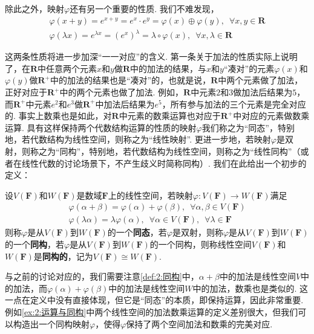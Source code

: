 除此之外，映射$\varphi$还有另一个重要的性质. 我们不难发现，
\begin{gather*}
    \varphi(x+y)=e^{x+y}=e^x\cdot e^y=\varphi(x)\oplus\varphi(y),\enspace\forall x,y\in\mathbf{R} \\
    \varphi(\lambda x)=e^{\lambda x}=(e^x)^\lambda=\lambda\circ\varphi(x),\enspace\forall x,\lambda\in\mathbf{R}
\end{gather*}

这两条性质将进一步加深``一一对应''的含义. 第一条关于加法的性质实际上说明了，在$\mathbf{R}$中任意两个元素$x$和$y$做$\mathbf{R}$中的加法的结果，与$x$和$y$``凑对''的元素$\varphi(x)$和$\varphi(y)$做$\mathbf{R}^+$中的加法的结果也是``凑对''的，也就是说，$\mathbf{R}$中两个元素做了加法，正好对应于$\mathbf{R}^+$中的两个元素也做了加法. 例如，$\mathbf{R}$中元素$2$和$3$做加法后结果为$5$，而$\mathbf{R}^+$中元素$e^2$和$e^3$做$\mathbf{R}^+$中加法后结果为$e^5$，所有参与加法的三个元素是完全对应的. 事实上数乘也是如此，对$\mathbf{R}$中元素的数乘运算也对应于$\mathbf{R}^+$中对应的元素做数乘运算. 具有这样保持两个代数结构运算的性质的映射$\varphi$我们称之为``同态''，特别地，若代数结构为线性空间，则称之为``线性映射''. 更进一步地，若映射$\varphi$是双射，则称之为``同构''，特别地，若代数结构为线性空间，则称之为``线性同构''（或者在线性代数的讨论场景下，不产生歧义时简称同构）. 我们在此给出一个初步的定义：
\begin{definition} \label{def:2:同构}
    设$V(\mathbf{F})$和$W(\mathbf{F})$是数域$\mathbf{F}$上的线性空间，若映射$\varphi:V(\mathbf{F})\to W(\mathbf{F})$满足
    \begin{gather*}
        \varphi(\alpha+\beta)=\varphi(\alpha)+\varphi(\beta),\enspace\forall\alpha,\beta\in V(\mathbf{F}) \\
        \varphi(\lambda\alpha)=\lambda\varphi(\alpha),\enspace\forall\alpha\in V(\mathbf{F}),\enspace\forall\lambda\in\mathbf{F}
    \end{gather*}
    则称$\varphi$是从$V(\mathbf{F})$到$W(\mathbf{F})$的一个\textbf{同态}，若$\varphi$是双射，则称$\varphi$是从$V(\mathbf{F})$到$W(\mathbf{F})$的一个\textbf{同构}，若$\varphi$是从$V(\mathbf{F})$到$W(\mathbf{F})$的一个同构，则称线性空间$V(\mathbf{F})$和$W(\mathbf{F})$是\textbf{同构的}，记为$V(\mathbf{F})\cong W(\mathbf{F})$.
\end{definition}

与之前的讨论对应的，我们需要注意\autoref{def:2:同构}中，$\alpha+\beta$中的加法是线性空间$V$中的加法，而$\varphi(\alpha)+\varphi(\beta)$中的加法是线性空间$W$中的加法，数乘也是类似的. 这一点在定义中没有直接体现，但它是``同态''的本质，即保持运算，因此非常重要. 例如\autoref{ex:2:运算与同构}中两个线性空间的加法数乘运算的定义差别很大，但我们可以构造出一个同构映射$\varphi$，使得$\varphi$保持了两个空间加法和数乘的完美对应.


